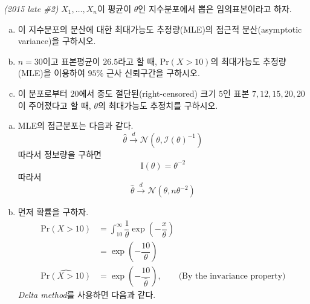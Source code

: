 \documentclass[answers]{exam}
\begin{document}
\newpage
{}
\begin{questions}
   \question
   \emph{(2015 late \#2)} $X_{1},\ldots, X_{n}$이 평균이 $\theta$인 지수분포에서 뽑은 임의표본이라고 하자.
   \begin{enumerate}[(a)]
    \item 이 지수분포의 분산에 대한 최대가능도 추정량(MLE)의 점근적 분산(asymptotic variance)을 구하시오.
    \item $n=30$이고 표본평균이 $26.5$라고 할 때, $\mathrm{Pr}\left(X>10\right)$의 최대가능도 추정량(MLE)을 이용하여 $95\%$ 근사 신뢰구간을 구하시오.
    \item 이 분포로부터 $20$에서 중도 절단된(right-censored) 크기 $5$인 표본 $7, 12, 15,20,20$이 주어졌다고 할 때, $\theta$의 최대가능도 추정치를 구하시오.
   \end{enumerate}
   \begin{solution}
    \begin{enumerate}[(a)]
      \item MLE의 점근분포는 다음과 같다.
      \begin{equation}
        \widehat{\theta} \xrightarrow{d}\mathcal{N}\left(\theta,\mathcal{I}\left(\theta\right)^{-1}\right)
      \end{equation}
      따라서 정보량을 구하면
      \begin{equation}
        \mathrm{I}\left(\theta\right) = \theta^{-2}
      \end{equation}
      따라서
      \begin{equation}
        \widehat{\theta}\xrightarrow{d}\mathcal{N}\left(\theta,n\theta^{-2}\right)
      \end{equation}
      \item 먼저 확률을 구하자.
      \begin{align}
        \mathrm{Pr}\left(X>10\right) &= \int_{10}^{\infty}\dfrac{1}{\theta}\exp\left(-\dfrac{x}{\theta}\right)\\
        &= \exp\left(-\dfrac{10}{\theta}\right)\\
        \widehat{\mathrm{Pr}\left(X>10\right)} &= \exp\left(-\dfrac{10}{\widehat{\theta}}\right),\qquad \text{(By the invariance property)}
      \end{align}
      \emph{Delta method}를 사용하면 다음과 같다.
      \begin{equation}

\end{equation}
\end{enumerate}
\end{solution}
\end{questions}
\end{document}
